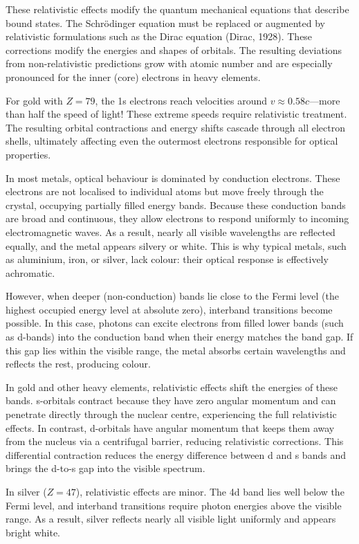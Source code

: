 These relativistic effects modify the quantum mechanical equations that describe bound states. The Schrödinger equation must be replaced or augmented by relativistic formulations such as the Dirac equation (Dirac, 1928). These corrections modify the energies and shapes of orbitals. The resulting deviations from non-relativistic predictions grow with atomic number and are especially pronounced for the inner (core) electrons in heavy elements.

For gold with $Z = 79$, the 1s electrons reach velocities around $v \approx 0.58c$—more than half the speed of light! These extreme speeds require relativistic treatment. The resulting orbital contractions and energy shifts cascade through all electron shells, ultimately affecting even the outermost electrons responsible for optical properties.

In most metals, optical behaviour is dominated by conduction electrons. These electrons are not localised to individual atoms but move freely through the crystal, occupying partially filled energy bands. Because these conduction bands are broad and continuous, they allow electrons to respond uniformly to incoming electromagnetic waves. As a result, nearly all visible wavelengths are reflected equally, and the metal appears silvery or white. This is why typical metals, such as aluminium, iron, or silver, lack colour: their optical response is effectively achromatic.

However, when deeper (non-conduction) bands lie close to the Fermi level (the highest occupied energy level at absolute zero), interband transitions become possible. In this case, photons can excite electrons from filled lower bands (such as d-bands) into the conduction band when their energy matches the band gap. If this gap lies within the visible range, the metal absorbs certain wavelengths and reflects the rest, producing colour.

In gold and other heavy elements, relativistic effects shift the energies of these bands. s-orbitals contract because they have zero angular momentum and can penetrate directly through the nuclear centre, experiencing the full relativistic effects. In contrast, d-orbitals have angular momentum that keeps them away from the nucleus via a centrifugal barrier, reducing relativistic corrections. This differential contraction reduces the energy difference between d and s bands and brings the d-to-s gap into the visible spectrum.

In silver ($Z = 47$), relativistic effects are minor. The 4d band lies well below the Fermi level, and interband transitions require photon energies above the visible range. As a result, silver reflects nearly all visible light uniformly and appears bright white.

